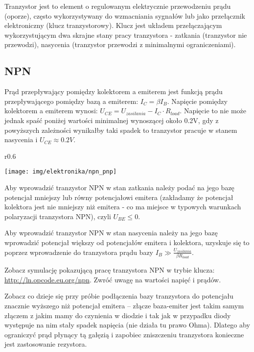 Tranzystor jest to element o regulowanym elektrycznie przewodzeniu prądu (oporze), często wykorzystywany do wzmacniania sygnałów lub jako przełącznik elektroniczny (klucz tranzystorowy).
Klucz jest układem przełączającym wykorzystującym dwa skrajne stany pracy tranzystora - zatkania (tranzystor nie przewodzi), nasycenia (tranzystor przewodzi z minimalnymi ograniczeniami).

\subsection{NPN}
Prąd przepływający pomiędzy kolektorem a emiterem jest funkcją prądu przepływającego pomiędzy bazą a emiterem: $I_C = \beta I_B$.
Napięcie pomiędzy kolektorem a emiterem wynosi: $U_{CE} = U_{zasilania} - I_C \cdot R_{load}$.
Napięcie to nie może jednak spaść poniżej wartości minimalnej wynoszącej około 0.2V, gdy z powyższych zależności wynikałby taki spadek to tranzystor pracuje w stanem nasycenia i $U_{CE} \approx 0.2V$.

\begin{wrapfigure}{r}{0.6\textwidth}
  \begin{center}
    \texttt{[image: img/elektronika/npn\_pnp]}
    \vspace{-10pt}
  \end{center}
\end{wrapfigure}

Aby wprowadzić tranzystor NPN w stan zatkania należy podać na jego bazę potencjał mniejszy lub równy potencjałowi emitera (zakładamy że potencjał kolektora jest nie mniejszy niż emitera - co ma miejsce w typowych warunkach polaryzacji tranzystora NPN), czyli $U_{BE} \leq 0$.

Aby wprowadzić tranzystor NPN w stan nasycenia należy na jego bazę wprowadzić potencjał większy od potencjałów emitera i kolektora, uzyskuje się to poprzez wprowadzenie do tranzystora prądu bazy $I_B \gg \frac{U_{zasilania}}{\beta R_{load}}$.

Zobacz symulację pokazującą pracę tranzystora NPN w trybie klucza: \url{http://ln.opcode.eu.org/npn}.
Zwróć uwagę na wartości napięć i prądów.

Zobacz co dzieje się przy próbie podłączenia bazy tranzystora do potencjału znacznie wyższego niż potencjał emitera – złącze baza-emiter jest takim samym złączem z jakim mamy do czynienia w diodzie i tak jak w przypadku diody występuje na nim stały spadek napięcia (nie działa tu prawo Ohma). Dlatego aby ograniczyć prąd płynący tą gałęzią i zapobiec zniszczeniu tranzystora konieczne jest zastosowanie rezystora.

